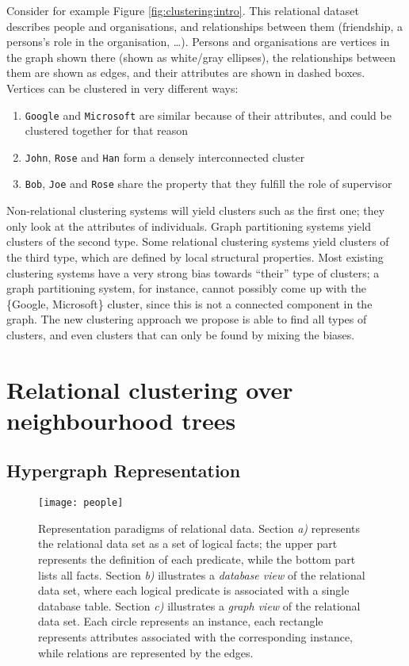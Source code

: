 Consider for example Figure \ref{fig:clustering:intro}.
This relational dataset describes people and organisations, and relationships between them (friendship, a persons’s role in the organisation, \ldots).
Persons and organisations are vertices in the graph shown there (shown as white/gray ellipses), the relationships between them are shown as edges, and their attributes are shown in dashed boxes.
Vertices can be clustered in very different ways:
\begin{enumerate}
    \item {\tt Google} and {\tt Microsoft} are similar because of their attributes, and could be clustered together for that reason
    \item {\tt John}, {\tt Rose} and {\tt Han} form a densely interconnected cluster
    \item {\tt Bob}, {\tt Joe} and {\tt Rose} share the property that they fulfill the role of supervisor
\end{enumerate}
Non-relational clustering systems will yield clusters such as the first one; they only look at the attributes of individuals.
Graph partitioning systems yield clusters of the second type.
Some relational clustering systems yield clusters of the third type, which are defined by local structural properties.
Most existing clustering systems have a very strong bias towards ``their'' type of clusters; a graph partitioning system, for instance, cannot possibly come up with the \{Google, Microsoft\} cluster, since this is not a connected component in the graph.
The new clustering approach we propose is able to find all types of clusters, and even clusters that can only be found by mixing the biases.








\section{Relational clustering over neighbourhood trees}
\label{sec:Approach}



\subsection{Hypergraph Representation}

\begin{figure}
  \centering
  \medskip
  \texttt{[image: people]}
  \caption{Representation paradigms of relational data. Section \textit{a)} represents the relational data set as a set of logical facts; the upper part represents the definition of each predicate, while the bottom part lists all facts. Section \textit{b)} illustrates a \textit{database view} of the relational data set, where each logical predicate is associated with a single database table.  Section \textit{c)}  illustrates a \textit{graph view} of the relational data set. Each circle represents an instance, each rectangle represents attributes associated with the corresponding instance, while relations are represented by the edges.}
  \label{fig:clustering:people}
\end{figure}

